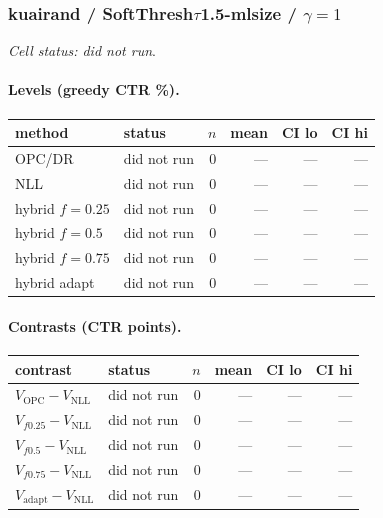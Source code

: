 \documentclass[10pt,a4paper]{article}
\begin{document}
\subsubsection{kuairand / SoftThresh$\tau$1.5-mlsize / $\gamma=1$}
\emph{Cell status: did not run}.
\paragraph{Levels (greedy CTR \%).}
{\centering\small\begin{tabular}{llrrrr}
\toprule method & status & $n$ & mean & CI lo & CI hi \\
\midrule
OPC/DR & did not run & 0 & --- & --- & --- \\
NLL & did not run & 0 & --- & --- & --- \\
hybrid $f{=}0.25$ & did not run & 0 & --- & --- & --- \\
hybrid $f{=}0.5$ & did not run & 0 & --- & --- & --- \\
hybrid $f{=}0.75$ & did not run & 0 & --- & --- & --- \\
hybrid adapt & did not run & 0 & --- & --- & --- \\
\bottomrule\end{tabular}\par}
\paragraph{Contrasts (CTR points).}
{\centering\small\begin{tabular}{llrrrr}
\toprule contrast & status & $n$ & mean & CI lo & CI hi \\
\midrule
$V_{\mathrm{OPC}}-V_{\mathrm{NLL}}$ & did not run & 0 & --- & --- & --- \\
$V_{f0.25}-V_{\mathrm{NLL}}$ & did not run & 0 & --- & --- & --- \\
$V_{f0.5}-V_{\mathrm{NLL}}$ & did not run & 0 & --- & --- & --- \\
$V_{f0.75}-V_{\mathrm{NLL}}$ & did not run & 0 & --- & --- & --- \\
$V_{\mathrm{adapt}}-V_{\mathrm{NLL}}$ & did not run & 0 & --- & --- & --- \\
\bottomrule\end{tabular}\par}
\end{document}
